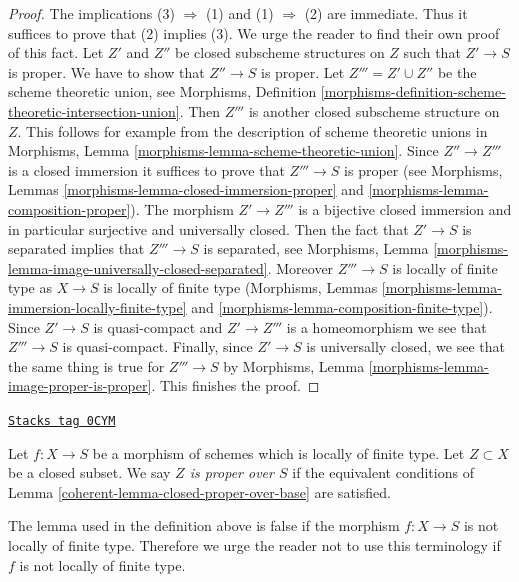 \begin{proof}
The implications (3) $\Rightarrow$ (1) and (1) $\Rightarrow$ (2)
are immediate. Thus it suffices to prove that (2) implies (3).
We urge the reader to find their own proof of this fact.
Let $Z'$ and $Z''$ be closed subscheme structures on $Z$
such that $Z' \to S$ is proper. We have to show that $Z'' \to S$ is proper.
Let $Z''' = Z' \cup Z''$ be the scheme theoretic union, see
Morphisms, Definition
\ref{morphisms-definition-scheme-theoretic-intersection-union}.
Then $Z'''$ is another closed subscheme structure on $Z$.
This follows for example from the description of scheme theoretic unions in
Morphisms, Lemma \ref{morphisms-lemma-scheme-theoretic-union}.
Since $Z'' \to Z'''$ is a closed immersion it suffices to prove
that $Z''' \to S$ is proper (see
Morphisms, Lemmas \ref{morphisms-lemma-closed-immersion-proper} and
\ref{morphisms-lemma-composition-proper}).
The morphism $Z' \to Z'''$ is a bijective closed immersion
and in particular surjective and universally closed.
Then the fact that $Z' \to S$ is separated implies that
$Z''' \to S$ is separated, see
Morphisms, Lemma \ref{morphisms-lemma-image-universally-closed-separated}.
Moreover $Z''' \to S$ is locally of finite type
as $X \to S$ is locally of finite type
(Morphisms, Lemmas \ref{morphisms-lemma-immersion-locally-finite-type} and
\ref{morphisms-lemma-composition-finite-type}).
Since $Z' \to S$ is quasi-compact and $Z' \to Z'''$ is a homeomorphism
we see that $Z''' \to S$ is quasi-compact.
Finally, since $Z' \to S$ is universally closed, we see that
the same thing is true for $Z''' \to S$ by
Morphisms, Lemma \ref{morphisms-lemma-image-proper-is-proper}.
This finishes the proof.
\end{proof}

\begin{definition}
\label{coherent-definition-proper-over-base}
\href{https://stacks.math.columbia.edu/tag/0CYM}{\texttt{Stacks tag 0CYM}}

Let $f : X \to S$ be a morphism of schemes which is locally of finite type.
Let $Z \subset X$ be a closed subset.
We say {\it $Z$ is proper over $S$}
if the equivalent conditions of Lemma \ref{coherent-lemma-closed-proper-over-base}
are satisfied.
\end{definition}

The lemma used in the definition above is false if the morphism
$f : X \to S$ is not locally of finite type. Therefore we urge
the reader not to use this terminology if $f$ is not locally of
finite type.

